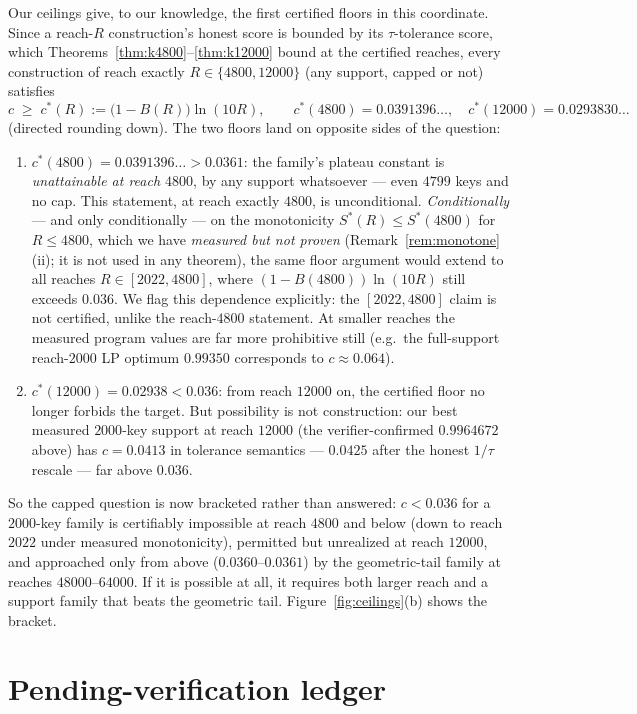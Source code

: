 \documentclass[11pt]{article}
\theoremstyle{remark}
\newcommand{\Sstar}{S^{*}}
\begin{document}
Our ceilings give, to our knowledge, the first certified floors in this
coordinate. Since a
reach-$R$ construction's honest score is bounded by its $\tau$-tolerance
score, which Theorems~\ref{thm:k4800}--\ref{thm:k12000} bound at the
certified reaches, every construction of reach exactly $R \in \{4800,
12000\}$ (any support, capped or not) satisfies
\[
c \;\ge\; c^*(R) := \bigl(1 - B(R)\bigr)\ln(10R), \qquad
c^*(4800) = 0.0391396\ldots, \quad c^*(12000) = 0.0293830\ldots
\]
(directed rounding down). The two floors land on opposite sides of the
question:
\begin{enumerate}
\item[(i)] $c^*(4800) = 0.0391396\ldots > 0.0361$: the family's plateau constant
is \emph{unattainable at reach $4800$}, by any support whatsoever ---
even $4799$ keys and no cap. This statement, at reach exactly $4800$, is
unconditional. \emph{Conditionally} --- and only conditionally --- on the
monotonicity $\Sstar(R) \le \Sstar(4800)$ for $R \le 4800$, which we have
\emph{measured but not proven} (Remark~\ref{rem:monotone}(ii); it is not
used in any theorem), the same floor argument would extend to all reaches
$R \in [2022, 4800]$, where $(1 - B(4800))\ln(10R)$ still exceeds $0.036$.
We flag this dependence explicitly: the $[2022,4800]$ claim is not
certified, unlike the reach-$4800$ statement. At smaller reaches the
measured program values are far more prohibitive still (e.g.\ the
full-support reach-$2000$ LP optimum $0.99350$ corresponds to
$c \approx 0.064$).
\item[(ii)] $c^*(12000) = 0.02938 < 0.036$: from reach $12000$ on, the
certified floor no longer forbids the target. But possibility is not
construction: our best measured $2000$-key support at reach $12000$
(the verifier-confirmed $0.9964672$ above) has $c = 0.0413$ in tolerance
semantics --- $0.0425$ after the honest $1/\tau$ rescale --- far above
$0.036$.
\end{enumerate}
So the capped question is now bracketed rather than answered: $c < 0.036$
for a $2000$-key family is certifiably impossible at reach $4800$ and
below (down to reach $2022$ under measured monotonicity), permitted but
unrealized at reach $12000$, and approached only from above ($0.0360$--$0.0361$) by
the geometric-tail family at reaches $48000$--$64000$. If it is possible at
all, it requires both larger reach and a support family that beats the
geometric tail. Figure~\ref{fig:ceilings}(b) shows the bracket.

\section{Pending-verification ledger}\label{sec:pending}
\end{document}
